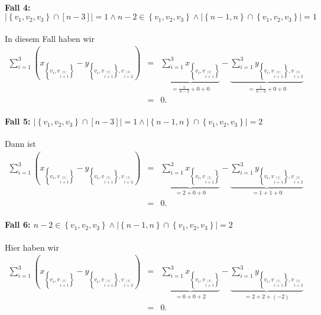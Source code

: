 \documentclass[10p,a4paper,BCOR = 12mm, DIV=15]{scrbook}
\begin{document}
{\begin{bew}
\paragraph{Fall 4: $\left|\left\{v_1, v_2, v_3\right\} \cap \left[n-3\right]\right| = 1 \wedge n-2 \in\left\{v_1, v_2, v_3\right\} \wedge  \left|\left\{n-1, n\right\} \cap \left\{v_1, v_2, v_3\right\}\right| = 1$} In diesem Fall haben wir
\begin{eqnarray*}
\sum_{i=1}^3 \left(x_{\left\{v_{i}, v_{i \stackrel{\left[3\right]}{+} 1}\right\}} - y_{\left\{v_{i}, v_{i \stackrel{\left[3\right]}{+} 1}\right\}, v_{i \stackrel{\left[3\right]}{+} 2}}\right) & = & \underbrace{\sum_{i=1}^3 x_{\left\{v_{i}, v_{i \stackrel{\left[3\right]}{+} 1}\right\}}}_{= \frac{1}{n-3} + 0 + 0} - \underbrace{\sum_{i=1}^3 y_{\left\{v_{i}, v_{i \stackrel{\left[3\right]}{+} 1}\right\}, v_{i \stackrel{\left[3\right]}{+} 2}}}_{= \frac{1}{n-3} + 0 + 0} \\
& = & 0.
\end{eqnarray*}

\paragraph{Fall 5: $\left|\left\{v_1, v_2, v_3\right\} \cap \left[n-3\right]\right| = 1 \wedge  \left|\left\{n-1, n\right\} \cap \left\{v_1, v_2, v_3\right\}\right| = 2$} Dann ist
\begin{eqnarray*}
\sum_{i=1}^3 \left(x_{\left\{v_{i}, v_{i \stackrel{\left[3\right]}{+} 1}\right\}} - y_{\left\{v_{i}, v_{i \stackrel{\left[3\right]}{+} 1}\right\}, v_{i \stackrel{\left[3\right]}{+} 2}}\right) & = & \underbrace{\sum_{i=1}^3 x_{\left\{v_{i}, v_{i \stackrel{\left[3\right]}{+} 1}\right\}}}_{= 2 + 0 + 0} - \underbrace{\sum_{i=1}^3 y_{\left\{v_{i}, v_{i \stackrel{\left[3\right]}{+} 1}\right\}, v_{i \stackrel{\left[3\right]}{+} 2}}}_{= 1 + 1 + 0} \\
& = & 0.
\end{eqnarray*}

\paragraph{Fall 6: $n-2 \in \left\{v_1, v_2, v_3\right\} \wedge  \left|\left\{n-1, n\right\} \cap \left\{v_1, v_2, v_3\right\}\right| = 2$} Hier haben wir
\begin{eqnarray*}
\sum_{i=1}^3 \left(x_{\left\{v_{i}, v_{i \stackrel{\left[3\right]}{+} 1}\right\}} - y_{\left\{v_{i}, v_{i \stackrel{\left[3\right]}{+} 1}\right\}, v_{i \stackrel{\left[3\right]}{+} 2}}\right) & = & \underbrace{\sum_{i=1}^3 x_{\left\{v_{i}, v_{i \stackrel{\left[3\right]}{+} 1}\right\}}}_{= 0 + 0 + 2} - \underbrace{\sum_{i=1}^3 y_{\left\{v_{i}, v_{i \stackrel{\left[3\right]}{+} 1}\right\}, v_{i \stackrel{\left[3\right]}{+} 2}}}_{= 2 + 2 + \left(-2\right)} \\
& = & 0.
\end{eqnarray*}


\end{bew}}
\end{document}

